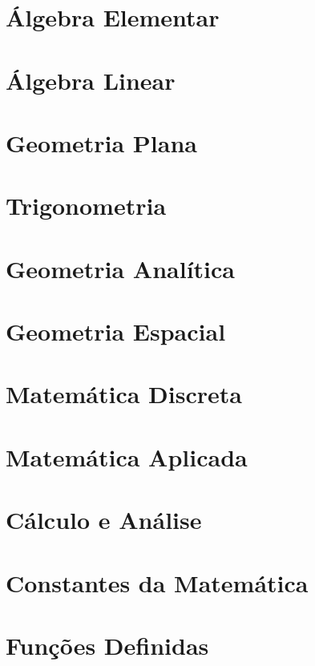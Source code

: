 \documentclass[10pt]{article} %
\begin{document}
    \section{Álgebra Elementar}
    \section{Álgebra Linear}
    \section{Geometria Plana}
    \section{Trigonometria}
    \section{Geometria Analítica}
    \section{Geometria Espacial}
    \section{Matemática Discreta}
    \section{Matemática Aplicada}
    \section{Cálculo e Análise}
    \section{Constantes da Matemática}
    \section{Funções Definidas}
\end{document}
